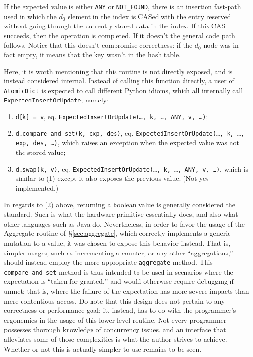 If the expected value is either \texttt{{ANY}} or \texttt{{NOT\_FOUND}}, there is an insertion fast-path used in which the $d_0$ element in the index is CASed with the entry reserved without going through the currently stored data in the index.
If this CAS succeeds, then the operation is completed.
If it doesn't the general code path follows.
Notice that this doesn't compromise correctness: if the $d_0$ node was in fact empty, it means that the key wasn't in the hash table.

Here, it is worth mentioning that this routine is not directly exposed, and is instead considered internal.
Instead of calling this function directly, a user of \texttt{AtomicDict} is expected to call different Python idioms, which all internally call \texttt{ExpectedInsertOrUpdate}; namely:

\begin{enumerate}
	\item \texttt{{d[k] = v}}, eq. \texttt{{ExpectedInsertOrUpdate(\ldots, k, \ldots, ANY, v, \ldots)}};
	\item \texttt{{d.compare\_and\_set(k, exp, des)}}, eq. \texttt{{ExpectedInsertOrUpdate(\ldots, k, \ldots, exp, des, \ldots)}}, which raises an exception when the expected value was not the stored value;
	\item \texttt{{d.swap(k, v)}}, eq. \texttt{{ExpectedInsertOrUpdate(\ldots, k, \ldots, ANY, v, \ldots)}}, which is similar to (1) except it also exposes the previous value.
	(Not yet implemented.)
\end{enumerate}

In regards to (2) above, returning a boolean value is generally considered the standard.
Such is what the hardware primitive essentially does, and also what other languages such as Java do.
Nevertheless, in order to favor the usage of the Aggregate routine of~\S\ref{sec:aggregate}, which correctly implements a generic mutation to a value, it was chosen to expose this behavior instead.
That is, simpler usages, such as incrementing a counter, or any other ``aggregations,'' should instead employ the more appropriate \texttt{aggregate} method.
This \texttt{compare\_and\_set} method is thus intended to be used in scenarios where the expectation is ``taken for granted,'' and would otherwise require debugging if unmet; that is, where the failure of the expectation has more severe impacts than mere contentious access.
Do note that this design does not pertain to any correctness or performance goal; it, instead, has to do with the programmer's ergonomics in the usage of this lower-level routine.
Not every programmer possesses thorough knowledge of concurrency issues, and an interface that alleviates some of those complexities is what the author strives to achieve.
Whether or not this is actually simpler to use remains to be seen.

